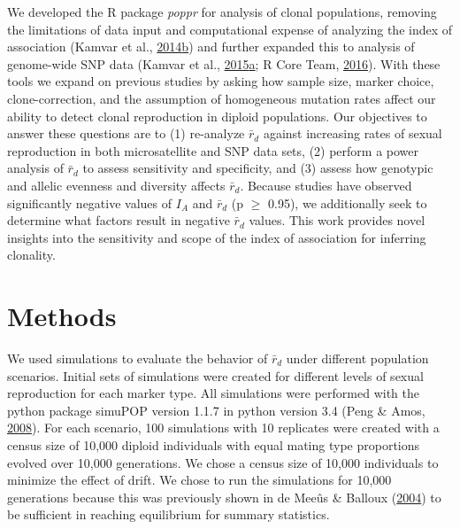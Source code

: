 \documentclass[double,11pt]{beavtex}
\begin{document}
  We developed the R package \emph{poppr} for analysis of clonal
  populations, removing the limitations of data input and computational
  expense of analyzing the index of association (Kamvar et al.,
  \protect\hyperlink{ref-kamvar2014poppr}{2014}\protect\hyperlink{ref-kamvar2014poppr}{b})
  and further expanded this to analysis of genome-wide SNP data (Kamvar et
  al.,
  \protect\hyperlink{ref-kamvar2015novel}{2015}\protect\hyperlink{ref-kamvar2015novel}{a};
  R Core Team, \protect\hyperlink{ref-R2016}{2016}). With these tools we
  expand on previous studies by asking how sample size, marker choice,
  clone-correction, and the assumption of homogeneous mutation rates
  affect our ability to detect clonal reproduction in diploid populations.
  Our objectives to answer these questions are to (1) re-analyze
  \(\bar{r}_d\) against increasing rates of sexual reproduction in both
  microsatellite and SNP data sets, (2) perform a power analysis of
  \(\bar{r}_d\) to assess sensitivity and specificity, and (3) assess how
  genotypic and allelic evenness and diversity affects \(\bar{r}_d\).
  Because studies have observed significantly negative values of \(I_A\)
  and \(\bar{r}_d\) (p \(\geq\) 0.95), we additionally seek to determine
  what factors result in negative \(\bar{r}_d\) values. This work provides
  novel insights into the sensitivity and scope of the index of
  association for inferring clonality.
  
  \section{Methods}\label{methods}
  
  We used simulations to evaluate the behavior of \(\bar{r}_d\) under
  different population scenarios. Initial sets of simulations were created
  for different levels of sexual reproduction for each marker type. All
  simulations were performed with the python package simuPOP version 1.1.7
  in python version 3.4 (Peng \& Amos,
  \protect\hyperlink{ref-peng2008forward}{2008}). For each scenario, 100
  simulations with 10 replicates were created with a census size of 10,000
  diploid individuals with equal mating type proportions evolved over
  10,000 generations. We chose a census size of 10,000 individuals to
  minimize the effect of drift. We chose to run the simulations for 10,000
  generations because this was previously shown in de Meeûs \& Balloux
  (\protect\hyperlink{ref-de2004clonal}{2004}) to be sufficient in
  reaching equilibrium for summary statistics.
  
\end{document}
